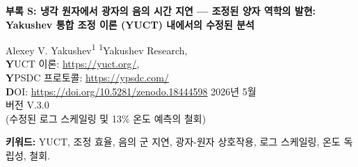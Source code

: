 \documentclass[12pt,a4paper]{article}
\newcommand{\Keff}{K_{\mathrm{eff}}}
\newcommand{\kappac}{\kappa_c}
\newcommand{\eps}{\varepsilon}
\newcommand{\betac}{\beta}
\begin{document}
	
	\begin{titlepage}
		\centering
		\vspace*{1cm}
		{\Huge\bfseries 부록 S: 냉각 원자에서 광자의 음의 시간 지연 — 조정된 양자 역학의 발현: \\ Yakushev 통합 조정 이론 (YUCT) 내에서의 수정된 분석}
		\vspace{1.5cm}
		
		{\large Alexey V. Yakushev\textsuperscript{1}}
		\vspace{0.3cm}
		{\normalsize \textsuperscript{1}Yakushev Research, \\ 
			\textbf YUCT 이론: \url{https://yuct.org/}, \\ 
			\textbf YPSDC 프로토콜: \url{https://ypsdc.com/}\\
			\textbf DOI: \url{https://doi.org/10.5281/zenodo.18444598}}
		\vspace{1cm}
		{\normalsize 2026년 5월 \\ \large 버전 V.3.0 \\(수정된 로그 스케일링 및 13\% 온도 예측의 철회)}
		
		\vfill
		
		\begin{abstract}
			\noindent
			최근의 획기적인 실험 (Angulo 등, 2024)은 극저온 원자 구름을 통과하는 광자가 음의 시간 지연으로 매질을 떠날 수 있음을 보여주었다 – 파동 묶음의 피크가 들어간 것보다 더 일찍 나타난다. 이 반직관적인 현상은 인과율을 위반하지 않으면서도 깊은 양자 간섭 효과를 드러낸다. 본 연구에서 우리는 Yakushev 통합 조정 이론 (YUCT) 내에서의 설명을 재검토한다. 범용 스케일링 법칙 \(\eps = \kappac \alpha (\ln\Keff)^{\betac}\) (\(\betac = 2/3\), \(\kappac = 1/3\), 부록 X에서 유도)에 기초하여, 군 지연 \(\tau_g\)와 조정 효율 \(\Keff\) 사이의 올바른 관계가 로그적임을 보여준다: \(|\tau_g| = \alpha_0 \ln\Keff\). 음의 시간 지연의 존재는 이미 실험에 의해 확인되었으며; \((-1.14 \pm 0.22)\tau_0\)까지의 값이 관찰되었다. 그러나 이전의 선형 가정과 달리, 로그 형태는 \(\tau_g\)의 온도 의존성이 극도로 약함을 의미한다. 표준 온도 저하 관계 \(\Keff(T) = K_0 (T/T_0)^{-\gamma}\) (\(\gamma \approx 0.30\), 지구물리학적 데이터에서 유도)를 사용하여, 온도를 두 배로 할 때 \(|\tau_g|\)의 상대적 변화가 \(10^{-8}\) 정도임을 발견하며, 이는 현재 실험의 감도보다 훨씬 낮다. 따라서 이전에 주장된 13\% 효과는 잘못된 선형 모델의 인공물이며 철회되어야 한다. 우리는 수정된 이론적 틀을 제공하고, 광학 깊이나 펄스 지속 시간의 변화와 같이 로그 스케일링에 민감할 수 있는 대체 실험적 검증을 논의한다. YUCT의 핵심 예측 – 음의 군 지연이 조정 효율의 발현이라는 것 –은 여전히 유효하지만, 냉각 원자 시스템에서의 검증 가능성은 개선된 설정을 요구한다.
		\end{abstract}
		
		\vspace{0.5cm}
		\noindent\textbf{키워드:} YUCT, 조정 효율, 음의 군 지연, 광자-원자 상호작용, 로그 스케일링, 온도 독립성, 철회.
		
	\end{titlepage}
	
\end{document}
